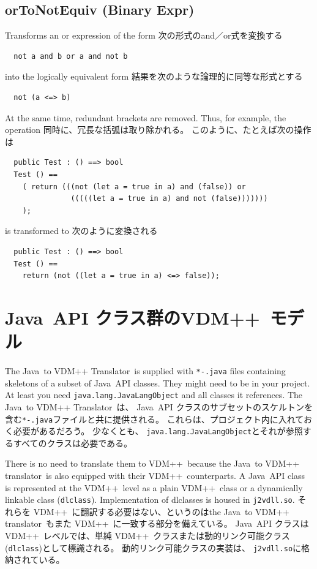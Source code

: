 \documentclass[\pformat,12pt]{jarticle}
\newcommand{\JAVA}{Java}
\newcommand{\tjTov}{the \JAVA\ to VDM++ translator}
\newcommand{\TjTov}{The \JAVA\ to VDM++ Translator}
\newcommand{\VDM}{VDM++}
\begin{document}
\subsection{orToNotEquiv (Binary Expr)}
  Transforms an or expression of the form
  次の形式のand／or式を変換する
\begin{verbatim}
  not a and b or a and not b
\end{verbatim}
into the logically equivalent form
結果を次のような論理的に同等な形式とする
\begin{verbatim}
  not (a <=> b)
\end{verbatim}
At the same time, redundant brackets are removed. Thus, for example,
the operation
同時に、冗長な括弧は取り除かれる。
このように、たとえば次の操作は
\begin{verbatim}
  public Test : () ==> bool
  Test () ==
    ( return (((not (let a = true in a) and (false)) or 
               (((((let a = true in a) and not (false)))))))
    );
\end{verbatim}
is transformed to
次のように変換される
\begin{verbatim}
  public Test : () ==> bool
  Test () ==
    return (not ((let a = true in a) <=> false));
\end{verbatim}

\newpage
\section{\JAVA\ API クラス群の\VDM\ モデル}\label{javaapi}

\TjTov\ is supplied with \texttt{*-.java} files containing skeletons of a subset of 
\JAVA\ API classes. They might need to be in your project.
At least you need \texttt{java.lang.JavaLangObject} and all classes it references.
\TjTov\ は、 \JAVA\ API クラスのサブセットのスケルトンを含む\texttt{*-.java}ファイルと共に提供される。 
これらは、プロジェクト内に入れておく必要があるだろう。
少なくとも、 \texttt{java.lang.JavaLangObject}とそれが参照するすべてのクラスは必要である。

There is no need to translate them to \VDM\ because \tjTov\ is
also equipped with their \VDM\ counterparts. 
A \JAVA\ API class is represented at the \VDM\ level as a
plain \VDM\ class or a dynamically linkable class (\texttt{dlclass}).
Implementation of dlclasses is housed in \texttt{j2vdll.so}.
それらを \VDM\ に翻訳する必要はない、というのは\tjTov\ もまた \VDM\ に一致する部分を備えている。
\JAVA\ API クラスは \VDM\ レベルでは、単純 \VDM\ クラスまたは動的リンク可能クラス (\texttt{dlclass})として標識される。
動的リンク可能クラスの実装は、 \texttt{j2vdll.so}に格納されている。
\end{document}
